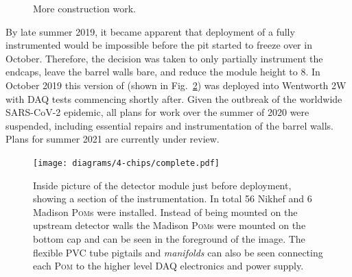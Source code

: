 \begin{figure} %
    \centering
    \quad
    \caption[More \chipsfive construction work]
    {More \chipsfive construction work.}
    \label{fig:work2}
\end{figure}

By late summer 2019, it became apparent that deployment of a fully instrumented \chipsfive would
be impossible before the pit started to freeze over in October. Therefore, the decision was taken
to only partially instrument the endcaps, leave the barrel walls bare, and reduce the module
height to \unit{8}{}. In October 2019 this version of \chipsfive (shown in
Fig.~\ref{fig:complete}) was deployed into Wentworth 2W with DAQ tests commencing shortly after.
Given the outbreak of the worldwide SARS-CoV-2 epidemic, all plans for work over the summer of
2020 were suspended, including essential repairs and instrumentation of the barrel walls. Plans
for summer 2021 are currently under review.

\begin{figure} %
    \texttt{[image: diagrams/4-chips/complete.pdf]}
    \caption[Inside picture of the \chipsfive detector module just before deployment]
    {Inside picture of the \chipsfive detector module just before deployment, showing a section of
        the instrumentation. In total 56 Nikhef and 6 Madison \textsc{Pom}s were installed.
        Instead of being mounted on the upstream detector walls the Madison \textsc{Pom}s were
        mounted on the bottom cap and can be seen in the foreground of the image. The flexible PVC
        tube pigtails and \emph{manifolds} can also be seen connecting each \textsc{Pom} to the
        higher level DAQ electronics and power supply.}
    \label{fig:complete}
\end{figure}

